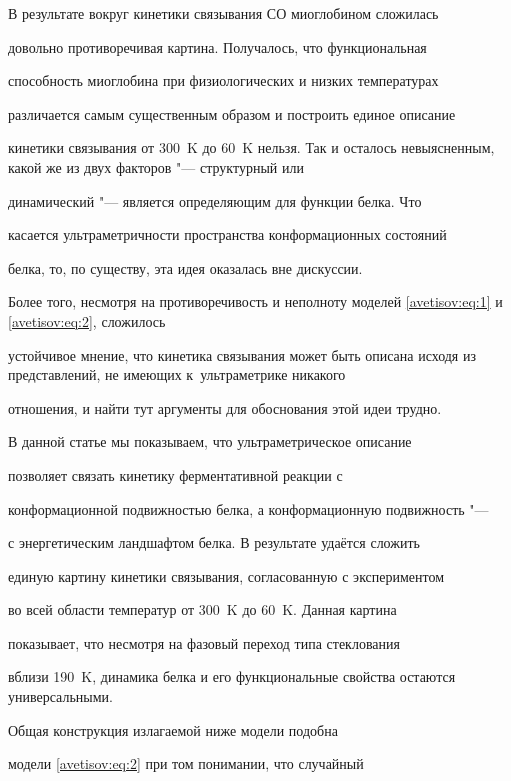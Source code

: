 В результате вокруг кинетики связывания СО миоглобином сложилась

довольно противоречивая картина.  Получалось, что функциональная

способность миоглобина при физиологических и низких температурах

различается самым существенным образом и построить единое описание

кинетики связывания от 300~K до 60~K нельзя. Так и осталось невыясненным, какой же из двух факторов "--- структурный или

динамический "--- является определяющим для функции белка. Что

касается ультраметричности пространства конформационных состояний

белка, то, по существу, эта идея оказалась вне дискуссии. 

Более того, несмотря на противоречивость  и неполноту моделей \eqref{avetisov:eq:1} и \eqref{avetisov:eq:2}, сложилось

устойчивое мнение, что кинетика связывания может быть описана исходя из представлений, не имеющих к~ультраметрике никакого

отношения, и найти тут аргументы для обоснования этой идеи трудно.



В данной статье мы показываем, что ультраметрическое описание

позволяет связать кинетику ферментативной реакции с

конформационной подвижностью белка, а конформационную подвижность "---

с энергетическим ландшафтом белка. В результате удаётся сложить

единую  картину кинетики связывания, согласованную с экспериментом

во всей области температур от 300~K до 60~K.  Данная картина

показывает, что несмотря на фазовый переход типа стеклования

вблизи 190~K, динамика белка и  его функциональные свойства остаются универсальными.



\smallskip



 Общая конструкция излагаемой ниже модели подобна

модели \eqref{avetisov:eq:2}  при том понимании, что случайный

